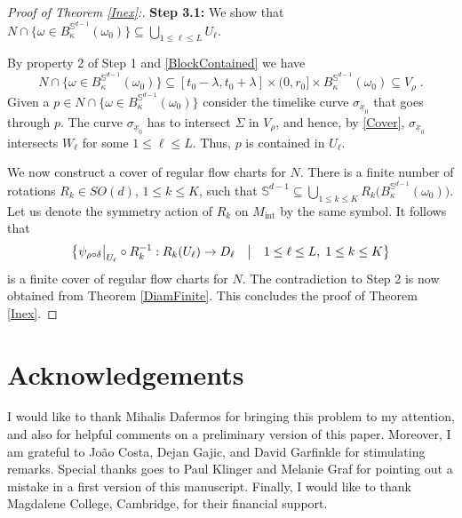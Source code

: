 \documentclass[reqno]{article}
\newcommand{\Sd}{\mathbb{S}^{d-1}}
\newcommand{\Mint}{M_{\mathrm{int}}}
\begin{document}
\begin{proof}[Proof of Theorem \ref{Inex}:]
\textbf{Step 3.1:} We show that $ N \cap \{ \omega \in B^{\Sd}_\kappa(\omega_0)\} \subseteq \bigcup_{1 \leq \ell \leq L} U_\ell$.
\vspace*{2mm}

By property 2 of Step 1 and \eqref{BlockContained} we have
\begin{equation*}
N \cap \{\omega \in B^{\Sd}_\kappa (\omega_0)\} \subseteq [t_0 - \lambda, t_0 + \lambda] \times (0, r_0] \times B^{\Sd}_\kappa(\omega_0) \subseteq V_\rho \;.
\end{equation*}
Given a $p \in N \cap \{ \omega \in B^{\Sd}_\kappa(\omega_0)\}$ consider the timelike curve $\sigma_{\underline{x}_0}$ that goes through $p$. The curve $\sigma_{\underline{x}_0}$ has to intersect $\Sigma$ in $V_\rho$, and hence, by \eqref{Cover}, $\sigma_{\underline{x}_0}$ intersects $W_\ell$ for some $1 \leq \ell \leq L$. Thus, $p$ is contained in $U_\ell$.
\vspace*{2mm}

We now construct a cover of regular flow charts for $N$. There is a finite number of rotations $R_k \in SO(d)$, $1 \leq k \leq K$, such that $\Sd \subseteq \bigcup_{1 \leq k \leq K} R_k \big(B^{\Sd}_\kappa(\omega_0)\big)$. Let us denote the symmetry action of $R_k$ on $\Mint$ by the same symbol. It follows that 
\begin{equation*}
\big{\{}\psi_{\rho \circ \delta}\big|_{U_\ell} \circ R_k^{-1} : R_k(U_\ell) \to D_\ell \quad \big| \quad 1 \leq \ell \leq L, \; 1 \leq k \leq K\big{\}}
\end{equation*}
is a finite cover of regular flow charts for $N$. The contradiction to Step 2 is now obtained from Theorem \ref{DiamFinite}.
This concludes the proof of Theorem \ref{Inex}.
\end{proof}






















\section*{Acknowledgements}
I would like to thank Mihalis Dafermos for bringing this problem to my attention, and also for helpful comments on a preliminary version of this paper. Moreover, I am grateful to  Jo\~ao Costa, Dejan Gajic, and David Garfinkle for stimulating remarks. Special thanks goes to Paul Klinger and Melanie Graf for pointing out a mistake in a first version of this manuscript.
Finally, I would like to thank Magdalene College, Cambridge, for their financial support.



\end{document}
